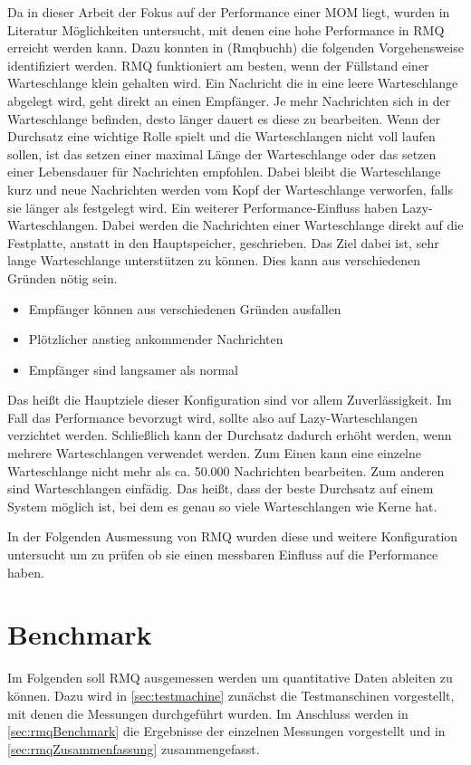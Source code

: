 Da in dieser Arbeit der Fokus auf der Performance einer MOM liegt, wurden in Literatur Möglichkeiten untersucht, mit denen eine hohe Performance in RMQ erreicht werden kann. Dazu konnten in (Rmqbuchh) die folgenden Vorgehensweise identifiziert werden. RMQ funktioniert am besten, wenn der Füllstand einer Warteschlange klein gehalten wird. Ein Nachricht die in eine leere Warteschlange abgelegt wird, geht direkt an einen Empfänger. Je mehr Nachrichten sich in der Warteschlange befinden, desto länger dauert es diese zu bearbeiten. Wenn der Durchsatz eine wichtige Rolle spielt und die Warteschlangen nicht voll laufen sollen, ist das setzen einer maximal Länge der Warteschlange oder das setzen einer Lebensdauer für Nachrichten empfohlen. Dabei bleibt die Warteschlange kurz und neue Nachrichten werden vom Kopf der Warteschlange verworfen, falls sie länger als festgelegt wird. Ein weiterer Performance-Einfluss haben Lazy-Warteschlangen. Dabei werden die Nachrichten einer Warteschlange direkt auf die Festplatte, anstatt in den Hauptspeicher, geschrieben. Das Ziel dabei ist, sehr lange Warteschlange unterstützen zu können. Dies kann aus verschiedenen Gründen nötig sein. 
\begin{itemize}
    \item Empfänger können aus verschiedenen Gründen ausfallen
    \item Plötzlicher anstieg ankommender Nachrichten
    \item Empfänger sind langsamer als normal
\end{itemize}
Das heißt die Hauptziele dieser Konfiguration sind vor allem Zuverlässigkeit. Im Fall das Performance bevorzugt wird, sollte also auf Lazy-Warteschlangen verzichtet werden. Schließlich kann der Durchsatz dadurch erhöht werden, wenn mehrere Warteschlangen verwendet werden. Zum Einen kann eine einzelne Warteschlange nicht mehr als ca. 50.000 Nachrichten bearbeiten. Zum anderen sind Warteschlangen einfädig. Das heißt, dass der beste Durchsatz auf einem System möglich ist, bei dem es genau so viele Warteschlangen wie Kerne hat. 

In der Folgenden Ausmessung von RMQ wurden diese und weitere Konfiguration untersucht um zu prüfen ob sie einen messbaren Einfluss auf die Performance haben.

\section{Benchmark}
Im Folgenden soll RMQ ausgemessen werden um quantitative Daten ableiten zu können. Dazu wird in \autoref{sec:testmachine} zunächst die Testmanschinen vorgestellt, mit denen die Messungen durchgeführt wurden. Im Anschluss werden in \autoref{sec:rmqBenchmark} die Ergebnisse der einzelnen Messungen vorgestellt und in \autoref{sec:rmqZusammenfassung} zusammengefasst.

